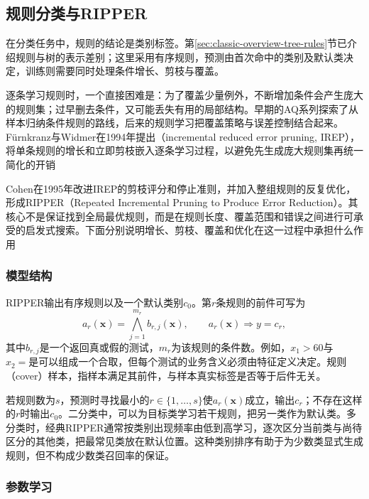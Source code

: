 \subsection{规则分类与RIPPER}
\label{sec:classification-rules}
\label{sec:classification-ripper}

在分类任务中，规则的结论是类别标签。第\ref{sec:classic-overview-tree-rules}节已介绍规则与树的表示差别；这里采用有序规则，预测由首次命中的类别及默认类决定，训练则需要同时处理条件增长、剪枝与覆盖。

逐条学习规则时，一个直接困难是：为了覆盖少量例外，不断增加条件会产生庞大的规则集；过早删去条件，又可能丢失有用的局部结构。早期的AQ系列探索了从样本归纳条件规则的路线，后来的规则学习把覆盖策略与误差控制结合起来。Fürnkranz与Widmer在1994年提出（incremental reduced error pruning, IREP），将单条规则的增长和立即剪枝嵌入逐条学习过程，以避免先生成庞大规则集再统一简化的开销

Cohen在1995年改进IREP的剪枝评分和停止准则，并加入整组规则的反复优化，形成RIPPER（Repeated Incremental Pruning to Produce Error Reduction）。其核心不是保证找到全局最优规则，而是在规则长度、覆盖范围和错误之间进行可承受的启发式搜索。下面分别说明增长、剪枝、覆盖和优化在这一过程中承担什么作用

\subsubsection{模型结构}
\label{sec:classification-ripper-structure}

RIPPER输出有序规则以及一个默认类别$c_0$。第$r$条规则的前件可写为
\begin{equation}
  a_r(\bm{x})=\bigwedge_{j=1}^{m_r}b_{r,j}(\bm{x}),
  \qquad a_r(\bm{x})\Longrightarrow y=c_r,
  \label{eq:classification-rule-form}
\end{equation}
其中$b_{r,j}$是一个返回真或假的测试，$m_r$为该规则的条件数。例如，$x_1>60$与$x_2=\text{是}$可以组成一个合取，但每个测试的业务含义必须由特征定义决定。规则（cover）样本，指样本满足其前件，与样本真实标签是否等于后件无关。

若规则数为$s$，预测时寻找最小的$r\in\{1,\ldots,s\}$使$a_r(\bm{x})$成立，输出$c_r$；不存在这样的$r$时输出$c_0$。二分类中，可以为目标类学习若干规则，把另一类作为默认类。多分类时，经典RIPPER通常按类别出现频率由低到高学习，逐次区分当前类与尚待区分的其他类，把最常见类放在默认位置。这种类别排序有助于为少数类显式生成规则，但不构成少数类召回率的保证。

\subsubsection{参数学习}
\label{sec:classification-ripper-learning}

